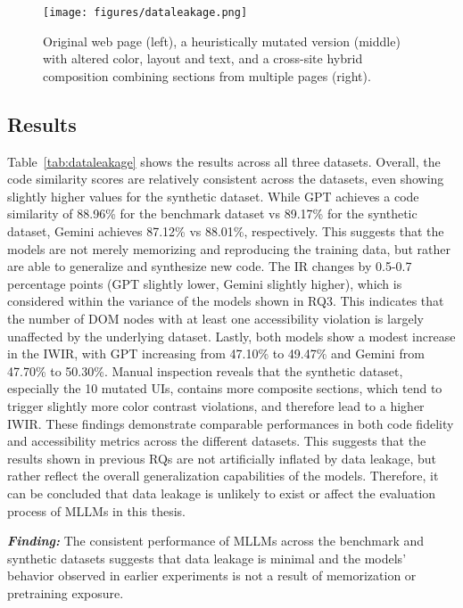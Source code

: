 \begin{figure}
  \centering
  \texttt{[image: figures/dataleakage.png]}
  \caption{Original web page (left), a heuristically mutated version (middle) with altered color, layout and text, and a cross-site hybrid composition combining sections from multiple pages (right).}
  \label{fig:dataleakagemutation} 
\end{figure}

\begingroup
    
\endgroup

\subsection{Results}
Table~\ref{tab:dataleakage} shows the results across all 
three datasets. Overall, the code similarity scores are 
relatively consistent across the datasets, even showing slightly 
higher values for the synthetic dataset. While GPT 
achieves a code similarity of 88.96\% for the benchmark dataset vs 
89.17\% for the synthetic dataset, Gemini
achieves 87.12\% vs 88.01\%, respectively. This 
suggests that the models are not merely memorizing and 
reproducing the training data, but rather are 
able to generalize and synthesize new code. The 
IR changes by 0.5-0.7 percentage points (GPT 
slightly lower, Gemini slightly higher), which is 
considered within the variance of the models 
shown in RQ3. This indicates that the number of 
DOM nodes with at least one accessibility violation 
is largely unaffected by the underlying dataset.
Lastly, both models show a modest increase in the 
IWIR, with GPT increasing from 47.10\% to 49.47\% 
and Gemini from 47.70\% to 50.30\%. Manual inspection 
reveals that the synthetic dataset, especially 
the 10 mutated UIs, contains more composite sections, 
which tend to trigger slightly more color 
contrast violations, and therefore lead 
to a higher IWIR.\newline
These findings demonstrate comparable performances 
in both code fidelity and accessibility metrics across
the different datasets. This suggests that the results 
shown in previous RQs are not artificially inflated 
by data leakage, but rather reflect the overall 
generalization capabilities of the models. Therefore,
it can be concluded that data leakage is unlikely to 
exist or affect the evaluation process of MLLMs in 
this thesis.

\begin{center}
\begin{tcolorbox}[colback=black!5!white,colframe=black!75!black,bottom=-0.05pt,top=-0.05pt]
\textit{\textbf{Finding:}} The consistent performance of 
MLLMs across the benchmark and synthetic datasets 
suggests that data leakage is minimal 
and the models' behavior observed in earlier 
experiments is not a result of memorization 
or pretraining exposure.
\end{tcolorbox}
\end{center}